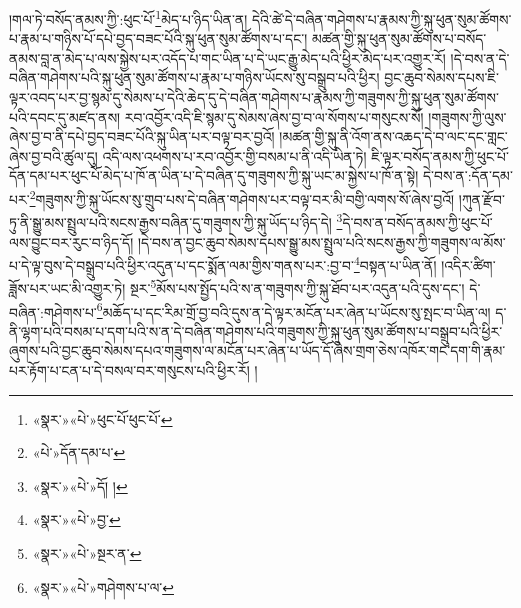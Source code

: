 །གལ་ཏེ་བསོད་ནམས་ཀྱི་:ཕུང་པོ་\footnote{«སྣར་»«པེ་»ཕུང་པོ་ཕུང་པོ་}མེད་པ་ཉིད་ཡིན་ན། དེའི་ཚེ་དེ་བཞིན་གཤེགས་པ་རྣམས་ཀྱི་སྐུ་ཕུན་སུམ་ཚོགས་པ་རྣམ་པ་གཉིས་པོ་དཔེ་བྱད་བཟང་པོའི་སྐུ་ཕུན་སུམ་ཚོགས་པ་དང་། མཚན་གྱི་སྐུ་ཕུན་སུམ་ཚོགས་པ་བསོད་ནམས་བླ་ན་མེད་པ་ལས་སྐྱེས་པར་འདོད་པ་གང་ཡིན་པ་དེ་ཡང་རྒྱུ་མེད་པའི་ཕྱིར་མེད་པར་འགྱུར་རོ། །དེ་བས་ན་དེ་བཞིན་གཤེགས་པའི་སྐུ་ཕུན་སུམ་ཚོགས་པ་རྣམ་པ་གཉིས་ཡོངས་སུ་བསྒྲུབ་པའི་ཕྱིར། བྱང་ཆུབ་སེམས་དཔས་ཇི་ལྟར་འབད་པར་བྱ་སྙམ་དུ་སེམས་པ་དེའི་ཆེད་དུ་དེ་བཞིན་གཤེགས་པ་རྣམས་ཀྱི་གཟུགས་ཀྱི་སྐུ་ཕུན་སུམ་ཚོགས་པའི་དབང་དུ་མཛད་ནས། རབ་འབྱོར་འདི་ཇི་སྙམ་དུ་སེམས་ཞེས་བྱ་བ་ལ་སོགས་པ་གསུངས་སོ། །གཟུགས་ཀྱི་ལུས་ཞེས་བྱ་བ་ནི་དཔེ་བྱད་བཟང་པོའི་སྐུ་ཡིན་པར་བལྟ་བར་བྱའོ། །མཚན་གྱི་སྐུ་ནི་འོག་ནས་འཆད་དེ་བ་ལང་དང་གླང་ཞེས་བྱ་བའི་ཚུལ་དུ། འདི་ལས་འཕགས་པ་རབ་འབྱོར་གྱི་བསམ་པ་ནི་འདི་ཡིན་ཏེ། ཇི་ལྟར་བསོད་ནམས་ཀྱི་ཕུང་པོ་དོན་དམ་པར་ཕུང་པོ་མེད་པ་ཁོ་ན་ཡིན་པ་དེ་བཞིན་དུ་གཟུགས་ཀྱི་སྐུ་ཡང་མ་སྐྱེས་པ་ཁོ་ན་སྟེ། དེ་བས་ན་:དོན་དམ་པར་\footnote{«པེ་»དོན་དམ་པ་}གཟུགས་ཀྱི་སྐུ་ཡོངས་སུ་གྲུབ་པས་དེ་བཞིན་གཤེགས་པར་བལྟ་བར་མི་བགྱི་ལགས་སོ་ཞེས་བྱའོ། །ཀུན་རྫོབ་ཏུ་ནི་སྒྱུ་མས་སྤྲུལ་པའི་སངས་རྒྱས་བཞིན་དུ་གཟུགས་ཀྱི་སྐུ་ཡོད་པ་ཉིད་དེ། \footnote{«སྣར་»«པེ་»དོ། ། }དེ་བས་ན་བསོད་ནམས་ཀྱི་ཕུང་པོ་ལས་བྱུང་བར་རུང་བ་ཉིད་དོ། །དེ་བས་ན་བྱང་ཆུབ་སེམས་དཔས་སྒྱུ་མས་སྤྲུལ་པའི་སངས་རྒྱས་ཀྱི་གཟུགས་ལ་མོས་པ་དེ་ལྟ་བུས་དེ་བསྒྲུབ་པའི་ཕྱིར་འདུན་པ་དང་སྨོན་ལམ་གྱིས་གནས་པར་:བྱ་བ་\footnote{«སྣར་»«པེ་»བྱ་}བསྟན་པ་ཡིན་ནོ། །འདིར་ཚིག་ཟློས་པར་ཡང་མི་འགྱུར་ཏེ། སྔར་\footnote{«སྣར་»«པེ་»སྔར་ན་}མོས་པས་སྤྱོད་པའི་ས་ན་གཟུགས་ཀྱི་སྐུ་ཐོབ་པར་འདུན་པའི་དུས་དང་། དེ་བཞིན་:གཤེགས་པ་\footnote{«སྣར་»«པེ་»གཤེགས་པ་ལ་}མཆོད་པ་དང་རིམ་གྲོ་བྱ་བའི་དུས་ན་དེ་ལྟར་མངོན་པར་ཞེན་པ་ཡོངས་སུ་སྤང་བ་ཡིན་ལ། ད་ནི་ལྷག་པའི་བསམ་པ་དག་པའི་ས་ན་དེ་བཞིན་གཤེགས་པའི་གཟུགས་ཀྱི་སྐུ་ཕུན་སུམ་ཚོགས་པ་བསྒྲུབ་པའི་ཕྱིར་ཞུགས་པའི་བྱང་ཆུབ་སེམས་དཔའ་གཟུགས་ལ་མངོན་པར་ཞེན་པ་ཡོད་དོ་ཞེས་གྲག་ཅེས་འཁོར་གང་དག་གི་རྣམ་པར་རྟོག་པ་ངན་པ་དེ་བསལ་བར་གསུངས་པའི་ཕྱིར་རོ། །
